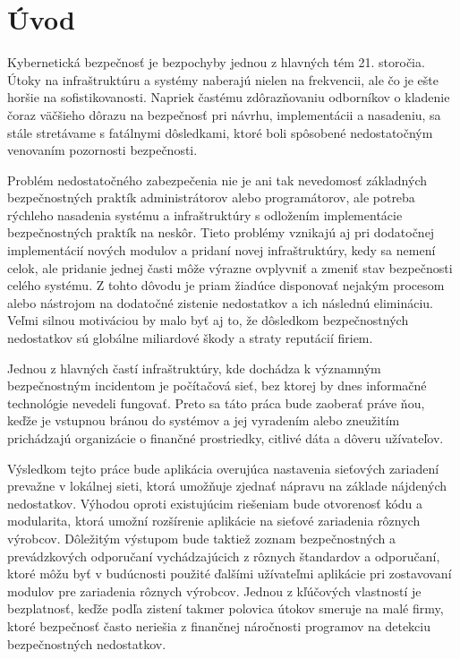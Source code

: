 \chapter*{Úvod}
{}



%

Kybernetická bezpečnosť je bezpochyby jednou z hlavných tém 21. storočia. Útoky na infraštruktúru a systémy naberajú nielen na frekvencii, ale čo je ešte horšie na sofistikovanosti. Napriek častému zdôrazňovaniu odborníkov o kladenie čoraz väčšieho dôrazu na bezpečnosť pri návrhu, implementácii a nasadeniu, sa stále stretávame s fatálnymi dôsledkami, ktoré boli spôsobené nedostatočným venovaním pozornosti bezpečnosti. 

Problém nedostatočného zabezpečenia nie je ani tak nevedomosť základných bezpečnostných praktík administrátorov alebo programátorov, ale potreba rýchleho nasadenia systému a infraštruktúry s odložením implementácie bezpečnostných praktík na neskôr. Tieto problémy vznikajú aj pri dodatočnej implementácií nových modulov a pridaní novej infraštruktúry, kedy sa nemení celok, ale pridanie jednej časti môže výrazne ovplyvniť a zmeniť stav bezpečnosti celého systému. Z tohto dôvodu je priam žiadúce disponovať nejakým procesom alebo nástrojom na dodatočné zistenie nedostatkov a ich následnú elimináciu. Veľmi silnou motiváciou by malo byť aj to, že dôsledkom bezpečnostných nedostatkov sú globálne miliardové škody a straty reputácií firiem. 

Jednou z hlavných častí infraštruktúry, kde dochádza k významným bezpečnostným incidentom je počítačová sieť, bez ktorej by dnes informačné technológie nevedeli fungovať. Preto sa táto práca bude zaoberať práve ňou, keďže je vstupnou bránou do systémov a jej vyradením alebo zneužitím prichádzajú organizácie o finančné prostriedky, citlivé dáta a dôveru užívateľov.

Výsledkom tejto práce bude aplikácia overujúca nastavenia sieťových zariadení prevažne v lokálnej sieti, ktorá umožňuje zjednať nápravu na základe nájdených nedostatkov. Výhodou oproti existujúcim riešeniam bude otvorenosť kódu a modularita, ktorá umožní rozšírenie aplikácie na sieťové zariadenia rôznych výrobcov. Dôležitým výstupom bude taktiež zoznam bezpečnostných a prevádzkových odporučaní vychádzajúcich z rôznych štandardov a odporučaní, ktoré môžu byť v budúcnosti použité ďalšími užívateľmi aplikácie pri zostavovaní modulov pre zariadenia rôznych výrobcov. Jednou z kľúčových vlastností je bezplatnosť, keďže podľa zistení takmer polovica útokov smeruje na malé firmy, ktoré bezpečnosť často neriešia z finančnej náročnosti programov na detekciu bezpečnostných nedostatkov.    
